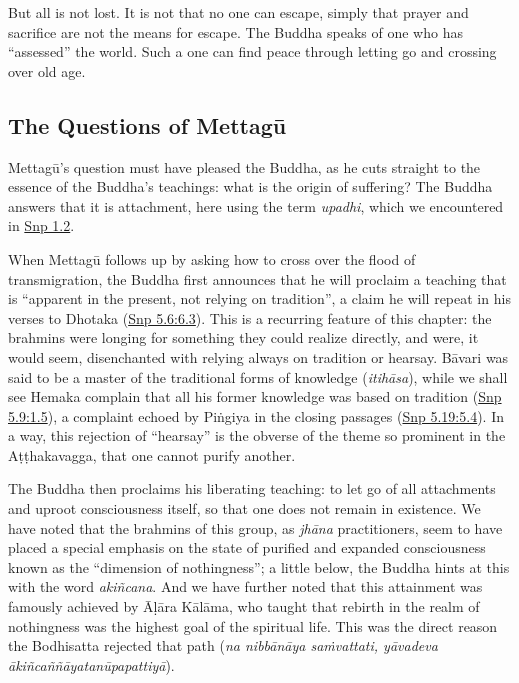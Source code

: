 \documentclass[12pt,openany]{book}%
\begin{document}
But all is not lost. It is not that no one can escape, simply that prayer and sacrifice are not the means for escape. The Buddha speaks of one who has “assessed” the world. Such a one can find peace through letting go and crossing over old age.

\subsection*{The Questions of \textsanskrit{Mettagū}}

\textsanskrit{Mettagū}’s question must have pleased the Buddha, as he cuts straight to the essence of the Buddha’s teachings: what is the origin of suffering? The Buddha answers that it is attachment, here using the term \textit{upadhi}, which we encountered in \href{https://suttacentral.net/snp1.2/en/sujato}{Snp 1.2}.

When \textsanskrit{Mettagū} follows up by asking how to cross over the flood of transmigration, the Buddha first announces that he will proclaim a teaching that is “apparent in the present, not relying on tradition”, a claim he will repeat in his verses to Dhotaka (\href{https://suttacentral.net/snp5.6/en/sujato\#6.3}{Snp 5.6:6.3}). This is a recurring feature of this chapter: the brahmins were longing for something they could realize directly, and were, it would seem, disenchanted with relying always on tradition or hearsay. \textsanskrit{Bāvari} was said to be a master of the traditional forms of knowledge (\textit{\textsanskrit{itihāsa}}), while we shall see Hemaka complain that all his former knowledge was based on tradition (\href{https://suttacentral.net/snp5.9/en/sujato\#1.5}{Snp 5.9:1.5}), a complaint echoed by \textsanskrit{Piṅgiya} in the closing passages (\href{https://suttacentral.net/snp5.19/en/sujato\#5.4}{Snp 5.19:5.4}). In a way, this rejection of “hearsay” is the obverse of the theme so prominent in the \textsanskrit{Aṭṭhakavagga}, that one cannot purify another.

The Buddha then proclaims his liberating teaching: to let go of all attachments and uproot consciousness itself, so that one does not remain in existence. We have noted that the brahmins of this group, as \textit{\textsanskrit{jhāna}} practitioners, seem to have placed a special emphasis on the state of purified and expanded consciousness known as the “dimension of nothingness”; a little below, the Buddha hints at this with the word \textit{\textsanskrit{akiñcana}}. And we have further noted that this attainment was famously achieved by \textsanskrit{Āḷāra} \textsanskrit{Kālāma}, who taught that rebirth in the realm of nothingness was the highest goal of the spiritual life. This was the direct reason the Bodhisatta rejected that path (\textit{na \textsanskrit{nibbānāya} \textsanskrit{saṁvattati}, \textsanskrit{yāvadeva} \textsanskrit{ākiñcaññāyatanūpapattiyā}}).
\end{document}

